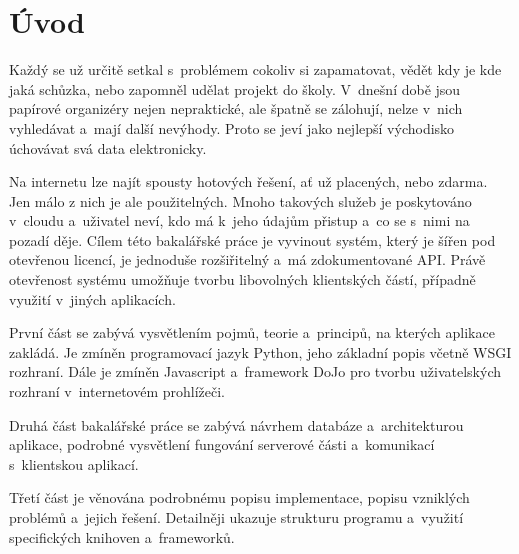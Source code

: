 \documentclass[bc,male,html,dept460]{diploma}				%
\begin{document}
\MakeTitlePages

\tableofcontents
\cleardoublepage	%

% 
% 
% 
% 


\section{Úvod}
\label{sec:uvod}
Každý se už určitě setkal s~problémem cokoliv si zapamatovat, vědět kdy je kde jaká schůzka, nebo zapomněl udělat projekt do školy. V~dnešní době jsou papírové organizéry nejen nepraktické, ale špatně se zálohují, nelze v~nich vyhledávat a~mají další nevýhody.
Proto se jeví jako nejlepší východisko úchovávat svá data elektronicky.

Na internetu lze najít spousty hotových řešení, ať už placených, nebo zdarma. Jen málo z nich je ale použitelných. Mnoho takových služeb je poskytováno v~cloudu a~uživatel neví, kdo má k~jeho údajům přistup a~co se s~nimi na pozadí děje.
Cílem této bakalářské práce je vyvinout systém, který je šířen pod otevřenou licencí, je jednoduše rozšiřitelný a~má zdokumentované API. Právě otevřenost systému umožňuje tvorbu libovolných klientských částí, případně využití v~jiných aplikacích.


První část se zabývá vysvětlením pojmů, teorie a~principů, na kterých aplikace zakládá. Je zmíněn programovací jazyk Python, jeho základní popis včetně WSGI rozhraní. Dále je zmíněn Javascript a~framework DoJo pro tvorbu uživatel\-ských rozhraní v~internetovém prohlížeči.

Druhá část bakalářské práce se zabývá návrhem databáze a~architekturou aplikace, podrobné vysvětlení fungování serverové části a~komunikací s~klientskou aplikací.

Třetí část je věnována podrobnému popisu implementace, popisu vzniklých problémů a~jejich řešení. Detailněji ukazuje strukturu programu a~využití specifických knihoven a~frameworků.
\end{document}
